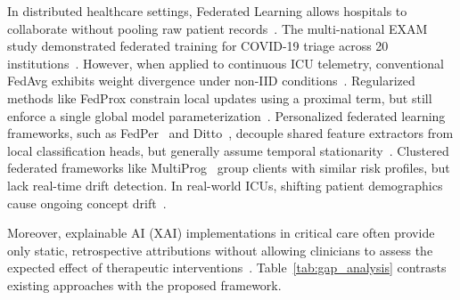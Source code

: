 \documentclass[11pt,a4paper]{article}
\begin{document}
In distributed healthcare settings, Federated Learning allows hospitals to collaborate without pooling raw patient records~\cite{mcmahan2017}. The multi-national EXAM study demonstrated federated training for COVID-19 triage across 20 institutions~\cite{dayan2021exam}. However, when applied to continuous ICU telemetry, conventional FedAvg exhibits weight divergence under non-IID conditions~\cite{li2020fedprox,tang2025horizon}. Regularized methods like FedProx constrain local updates using a proximal term, but still enforce a single global model parameterization~\cite{li2020fedprox}. Personalized federated learning frameworks, such as FedPer~\cite{arivazhagan2020} and Ditto~\cite{li2021ditto}, decouple shared feature extractors from local classification heads, but generally assume temporal stationarity~\cite{wang2025personalized}. Clustered federated frameworks like MultiProg~\cite{pan2025multiprog} group clients with similar risk profiles, but lack real-time drift detection. In real-world ICUs, shifting patient demographics cause ongoing concept drift~\cite{jothimurugesan2022,bernardi2023adaptive}.

Moreover, explainable AI (XAI) implementations in critical care often provide only static, retrospective attributions without allowing clinicians to assess the expected effect of therapeutic interventions~\cite{lundberg2018explainable,choi2016retain}. Table~\ref{tab:gap_analysis} contrasts existing approaches with the proposed framework.
\end{document}
